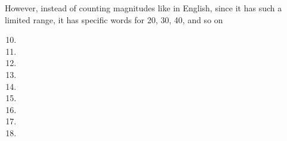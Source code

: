 However, instead of counting magnitudes like in English, since it has such a limited range, it has specific words for 20, 30, 40, and so on

\begin{multicols}{5}
    \begin{enumerate}
        \setcounter{enumi}{9}
        \item {} \setcounter{enumi}{19}
        \item {} \setcounter{enumi}{29}
        \item {} \setcounter{enumi}{39}
        \item {} \setcounter{enumi}{49}
        \item {} \setcounter{enumi}{59}
        \item {} \setcounter{enumi}{69}
        \item {} \setcounter{enumi}{79}
        \item {} \setcounter{enumi}{89}
        \item {}
    \end{enumerate}
\end{multicols}
